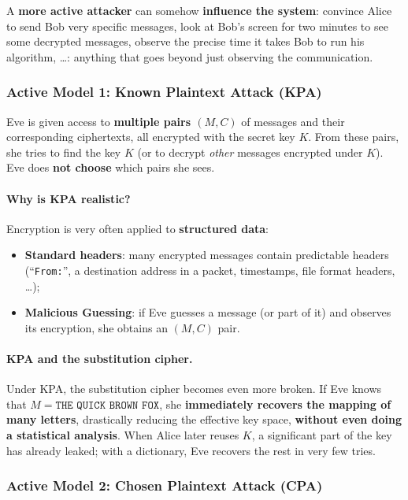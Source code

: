 A \textbf{more active attacker} can somehow \textbf{influence the system}: convince Alice to send Bob very specific messages, look at Bob's screen for two minutes to see some decrypted messages, observe the precise time it takes Bob to run his algorithm, \dots: anything that goes beyond just observing the communication.

\subsubsection{Active Model 1: Known Plaintext Attack (KPA)}

\begin{definition}
Eve is given access to \textbf{multiple pairs $(M, C)$} of messages and their corresponding ciphertexts, all encrypted with the secret key $K$. From these pairs, she tries to find the key $K$ (or to decrypt \emph{other} messages encrypted under $K$). Eve does \textbf{not choose} which pairs she sees.
\end{definition}

\paragraph{Why is KPA realistic?} Encryption is very often applied to \textbf{structured data}:
\begin{itemize}
  \item \textbf{Standard headers}: many encrypted messages contain predictable headers (``\texttt{From:}'', a destination address in a packet, timestamps, file format headers, \dots);
  \item \textbf{Malicious Guessing}: if Eve guesses a message (or part of it) and observes its encryption, she obtains an $(M, C)$ pair.
\end{itemize}

\paragraph{KPA and the substitution cipher.} Under KPA, the substitution cipher becomes even more broken. If Eve knows that $M = \texttt{THE QUICK BROWN FOX}$, she \textbf{immediately recovers the mapping of many letters}, drastically reducing the effective key space, \textbf{without even doing a statistical analysis}. When Alice later reuses $K$, a significant part of the key has already leaked; with a dictionary, Eve recovers the rest in very few tries.

\subsubsection{Active Model 2: Chosen Plaintext Attack (CPA)}

